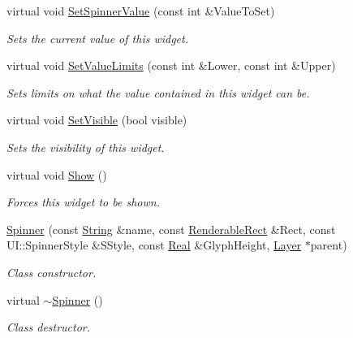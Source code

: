 \begin{DoxyCompactItemize}
virtual void \hyperlink{classphys_1_1UI_1_1Spinner_a7943087a7b61ec2ac7dcb7acab0e5345}{SetSpinnerValue} (const int \&ValueToSet)
\begin{DoxyCompactList}\small\item\em Sets the current value of this widget. \item\end{DoxyCompactList}\item 
virtual void \hyperlink{classphys_1_1UI_1_1Spinner_a933ec4a012ee5406b5ec576b0585a9c9}{SetValueLimits} (const int \&Lower, const int \&Upper)
\begin{DoxyCompactList}\small\item\em Sets limits on what the value contained in this widget can be. \item\end{DoxyCompactList}\item 
virtual void \hyperlink{classphys_1_1UI_1_1Spinner_a4fddc28f38174c4a89761efa00ae88c3}{SetVisible} (bool visible)
\begin{DoxyCompactList}\small\item\em Sets the visibility of this widget. \item\end{DoxyCompactList}\item 
\hypertarget{classphys_1_1UI_1_1Spinner_ac30c60ae55de67078a09c2d996a694fa}{
virtual void \hyperlink{classphys_1_1UI_1_1Spinner_ac30c60ae55de67078a09c2d996a694fa}{Show} ()}
\label{classphys_1_1UI_1_1Spinner_ac30c60ae55de67078a09c2d996a694fa}

\begin{DoxyCompactList}\small\item\em Forces this widget to be shown. \item\end{DoxyCompactList}\item 
\hyperlink{classphys_1_1UI_1_1Spinner_ad82c8fa511a4df09aaa4c7f5872bd5ed}{Spinner} (const \hyperlink{namespacephys_aa03900411993de7fbfec4789bc1d392e}{String} \&name, const \hyperlink{structphys_1_1UI_1_1RenderableRect}{RenderableRect} \&Rect, const UI::SpinnerStyle \&SStyle, const \hyperlink{namespacephys_af7eb897198d265b8e868f45240230d5f}{Real} \&GlyphHeight, \hyperlink{classphys_1_1UI_1_1Layer}{Layer} $\ast$parent)
\begin{DoxyCompactList}\small\item\em Class constructor. \item\end{DoxyCompactList}\item 
\hypertarget{classphys_1_1UI_1_1Spinner_adc7629a1ef57ef62a4e453ce3c66d808}{
virtual \hyperlink{classphys_1_1UI_1_1Spinner_adc7629a1ef57ef62a4e453ce3c66d808}{$\sim$Spinner} ()}
\label{classphys_1_1UI_1_1Spinner_adc7629a1ef57ef62a4e453ce3c66d808}

\begin{DoxyCompactList}\small\item\em Class destructor. \item\end{DoxyCompactList}\end{DoxyCompactItemize}
